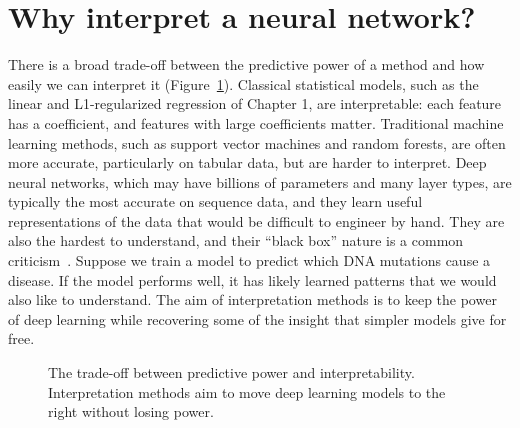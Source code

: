 \section{Why interpret a neural network?}
\label{sec:why_interpret}

There is a broad trade-off between the predictive power of a method and how easily we can interpret it (Figure~\ref{fig:power_interp}). Classical statistical models, such as the linear and L1-regularized regression of Chapter 1, are interpretable: each feature has a coefficient, and features with large coefficients matter. Traditional machine learning methods, such as support vector machines and random forests, are often more accurate, particularly on tabular data, but are harder to interpret. Deep neural networks, which may have billions of parameters and many layer types, are typically the most accurate on sequence data, and they learn useful representations of the data that would be difficult to engineer by hand. They are also the hardest to understand, and their ``black box'' nature is a common criticism~\citep{castelvecchi2016}. Suppose we train a model to predict which DNA mutations cause a disease. If the model performs well, it has likely learned patterns that we would also like to understand. The aim of interpretation methods is to keep the power of deep learning while recovering some of the insight that simpler models give for free.

\begin{figure}[t]
  \centering
  \caption{The trade-off between predictive power and interpretability. Interpretation methods aim to move deep learning models to the right without losing power.}
  \label{fig:power_interp}
\end{figure}

